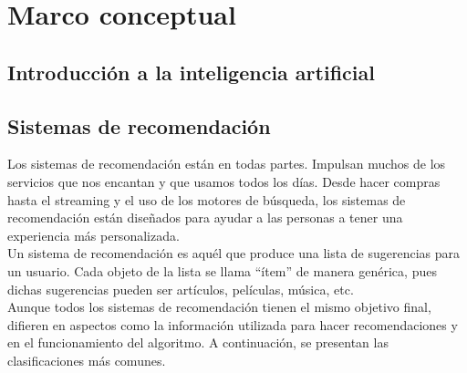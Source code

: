 \section{Marco conceptual}
\subsection{Introducción a la inteligencia artificial}
\subsection{Sistemas de recomendación}
Los sistemas de recomendación están en todas partes. Impulsan muchos de los servicios que nos encantan y que usamos todos los días. 
Desde hacer compras hasta el streaming y el uso de los motores de búsqueda, los sistemas de recomendación están diseñados para 
ayudar a las personas a tener una experiencia más personalizada.\\
\newline
Un sistema de recomendación es aquél que produce una lista de sugerencias para un usuario. Cada objeto de la lista se llama “ítem” 
de manera genérica, pues dichas sugerencias pueden ser artículos, películas, música, etc.\\
\newline
Aunque todos los sistemas de recomendación tienen el mismo objetivo final, difieren en aspectos como la información utilizada para 
hacer recomendaciones y en el funcionamiento del algoritmo. A continuación, se presentan las clasificaciones más comunes.

